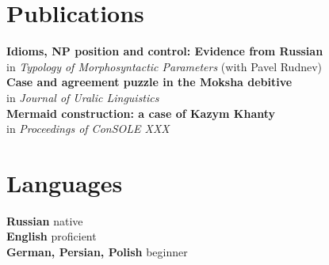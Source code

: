 \documentclass[11pt]{article} %
\begin{document}
\section*{Publications}

 \textbf{Idioms, NP position and control: Evidence from Russian}\\ in \emph{Typology of Morphosyntactic Parameters} (with Pavel Rudnev)\\
 \textbf{Case and agreement puzzle in the Moksha debitive} \\ in \emph{Journal of Uralic Linguistics}\\
 \textbf{Mermaid construction: a case of Kazym Khanty}\\ in \emph{Proceedings of ConSOLE XXX}\\

\section*{Languages}

\textbf{Russian} native\\
\textbf{English} proficient\\
\textbf{German, Persian, Polish} beginner




\end{document}
